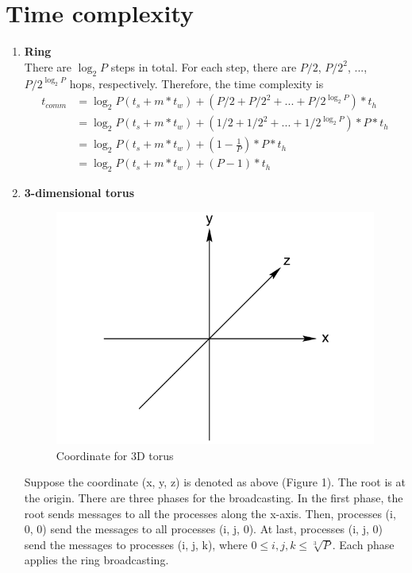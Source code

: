 \documentclass[10pt,letterpaper]{article}
\begin{document}
\section{Time complexity}
\begin{enumerate}
\item \textbf{Ring} \\[10pt]
There are $\log_2P$ steps in total. For each step, there are $P/2$, $P/2^2$, ..., $P/2^{\log_2P}$ hops, respectively. Therefore, the time complexity is
\begin{align*}
t_{comm} &= \log_2P(t_s + m*t_w) + (P/2+P/2^2+...+P/2^{\log_2P})*t_h\\
&= \log_2P(t_s + m*t_w) + (1/2+1/2^2+...+1/2^{\log_2P})*P*t_h\\
&= \log_2P(t_s + m*t_w)+(1-\frac{1}{P})*P*t_h\\
&= \log_2P(t_s + m*t_w)+(P-1)*t_h
\end{align*}
\item \textbf{3-dimensional torus}\\[10pt]
\begin{figure}
\centering
\includegraphics[scale=0.3]{handed.png}
\caption{Coordinate for 3D torus}
\end{figure}
Suppose the coordinate (x, y, z) is denoted as above (Figure 1). The root is at the origin. There are three phases for the broadcasting. In the first phase, the root sends messages to all the processes along the x-axis. Then, processes (i, 0, 0) send the messages to all processes (i, j, 0). At last, processes (i, j, 0) send the messages to processes (i, j, k), where $0 \le i, j, k \le \sqrt[3]{P}$. Each phase applies the ring broadcasting.

\end{enumerate}
\end{document}
